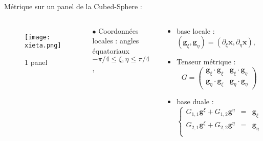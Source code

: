 \documentclass[11pt]{beamer}
\begin{document}
\begin{frame}{Métrique sur un panel de la Cubed-Sphere :}
\begin{columns}
\begin{figure}
\begin{center}
\texttt{[image: xieta.png]}
\end{center}
\caption{1 panel}
\end{figure}

\begin{block}{}
$\bullet$ Coordonnées locales : angles équatoriaux $- \pi/4 \leq \xi, \eta \leq \pi/4$ ,
\end{block}

\begin{block}{}
\begin{itemize}
\item base locale : $(\mathbf{g}_{\xi}, \mathbf{g}_{\eta} ) = ( \partial_{\xi} \mathbf{x}, \partial_{\eta} \mathbf{x} )$,

\item Tenseur métrique :
$$G = \begin{pmatrix}
\mathbf{g}_{\xi} \cdot \mathbf{g}_{\xi} & \mathbf{g}_{\xi} \cdot \mathbf{g}_{\eta} \\ 
\mathbf{g}_{\eta} \cdot \mathbf{g}_{\xi} & \mathbf{g}_{\eta} \cdot \mathbf{g}_{\eta}
\end{pmatrix} $$

\item base duale :
\begin{equation*}
\left\{
\begin{array}{ccc}
G_{1,1}\mathbf{g}^{\xi} + G_{1,2}\mathbf{g}^{\eta} & = & \mathbf{g}_{\xi} \\ 
G_{2,1}\mathbf{g}^{\xi} + G_{2,2}\mathbf{g}^{\eta} & = & \mathbf{g}_{\eta} \\ 
\end{array} 
\right.
\end{equation*}


\end{itemize}
\end{block}
\end{columns}
\end{frame}
\end{document}

